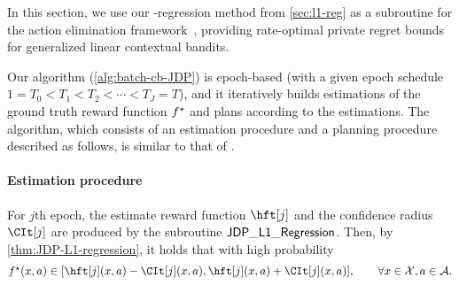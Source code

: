 

In this section, we use our \Lone-regression method from \cref{sec:l1-reg} as a subroutine for the action elimination framework~\citep{li2024optimal}, providing rate-optimal private regret bounds for generalized linear contextual bandits. 

Our algorithm (\cref{alg:batch-cb-JDP}) is epoch-based (with a given epoch schedule $1=T_0<T_1<T_2<\cdots<T_{J}=T$), and it iteratively builds estimations of the ground truth reward function $f^\star$ and plans according to the estimations. The algorithm, which consists of an estimation procedure and a planning procedure described as follows, is similar to that of \citet{li2024optimal}. 
\arxiv{

}






\paragraph{Estimation procedure}
For $j$th epoch, the estimate reward function $\hft[j]$ and the confidence radius $\CIt[j]$ are produced by the subroutine $\mathsf{JDP\_L1\_Regression}$. Then, by \cref{thm:JDP-L1-regression}, it holds that with high probability
\begin{align}\label{eq:CI-bound}
\textstyle
    \fs(x,a)\in \brac{ \hft[j](x,a)-\CIt[j](x,a), \hft[j](x,a)+\CIt[j](x,a) }, \qquad \forall x\in\cX, a\in\cA.
\end{align}


